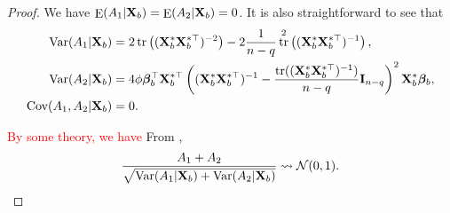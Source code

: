 \documentclass[11pt]{article}
\newcommand\CG[1]{\textcolor{red}{#1}}
\DeclareMathOperator{\mytr}{tr}
\DeclareMathOperator{\myE}{E}
\DeclareMathOperator{\myVar}{Var}
\newcommand{\bfsym}[1]{\ensuremath{\boldsymbol{#1}}}
\def\bbeta{\bfsym \beta}
\theoremstyle{plain}
\theoremstyle{definition}
\theoremstyle{remark}
\begin{document}
\begin{appendices}
\begin{proof}
We have $\myE (A_1|\BX_b)=\myE (A_2|\BX_b)=0$.
It is also straightforward to see that 
\begin{equation*}
    \begin{split}
        \myVar (A_1|\BX_b)
        &= 2\mytr  \left( (\BX_b^* \BX_b^{*\top})^{-2} \right)
                -2\frac{1}{n-q} \mytr^2 \left( (\BX_b^* \BX_b^{*\top})^{-1}\right)
                ,
                \\
                \myVar (A_2|\BX_b)&= 
                4 \phi \bbeta_b^\top \BX_b^{*\top}
                \left( (\BX_b^* \BX_b^{*\top})^{-1} 
                -\frac{\mytr ( (\BX_b^* \BX_b^{*\top})^{-1})}{n-q} 
                \BI_{n-q}
            \right)^2  \BX_b^* \bbeta_b
            ,\\
            \text{Cov} (A_1,A_2|\BX_b)&=0.
    \end{split}
\end{equation*}

\CG{By some theory, we have}
    From \cite[Theorem 5.1]{jiang1996reml},
\begin{equation*}
    \frac{A_1+A_2}{\sqrt{\myVar(A_1|\BX_b) + \myVar (A_2 |\BX_b)}} \rightsquigarrow \mathcal N(0,1).
\end{equation*}



\end{proof}
\end{appendices}
\end{document}
